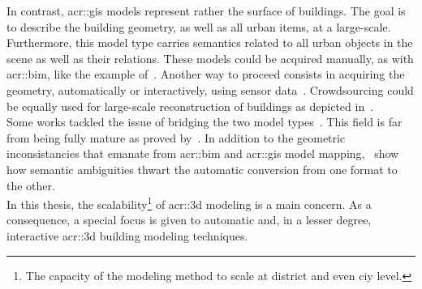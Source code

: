             In contrast, \gls{acr::gis} models represent rather the surface of buildings.
            The goal is to describe the building geometry, as well as all urban items, at a large-scale.
            Furthermore, this model type carries semantics related to all urban objects in the scene as well as their relations.
            These models could be acquired manually, as with \gls{acr::bim}, like the example of~\textcite{ref3dnat}.
            Another way to proceed consists in acquiring the geometry, automatically or interactively, using sensor data~\parencite{musialski2013survey}.
            Crowdsourcing could be equally used for large-scale reconstruction of buildings as depicted in~\textcite{uden2013open}.\\

            Some works tackled the issue of bridging the two model types~\parencite{deng2016mapping}.
            This field is far from being fully mature as proved by~\textcite{stoter2018geo}.
            In addition to the geometric inconsistancies that emanate from \gls{acr::bim} and \gls{acr::gis} model mapping,~\textcite{stoter2018geo} show how semantic ambiguities thwart the automatic conversion from one format to the other.\\

            In this thesis, the scalability\footnote{The capacity of the modeling method to scale at district and even ciy level.} of \gls{acr::3d} modeling is a main concern.
            As a consequence, a special focus is given to automatic and, in a lesser degree, interactive \gls{acr::3d} building modeling techniques.

